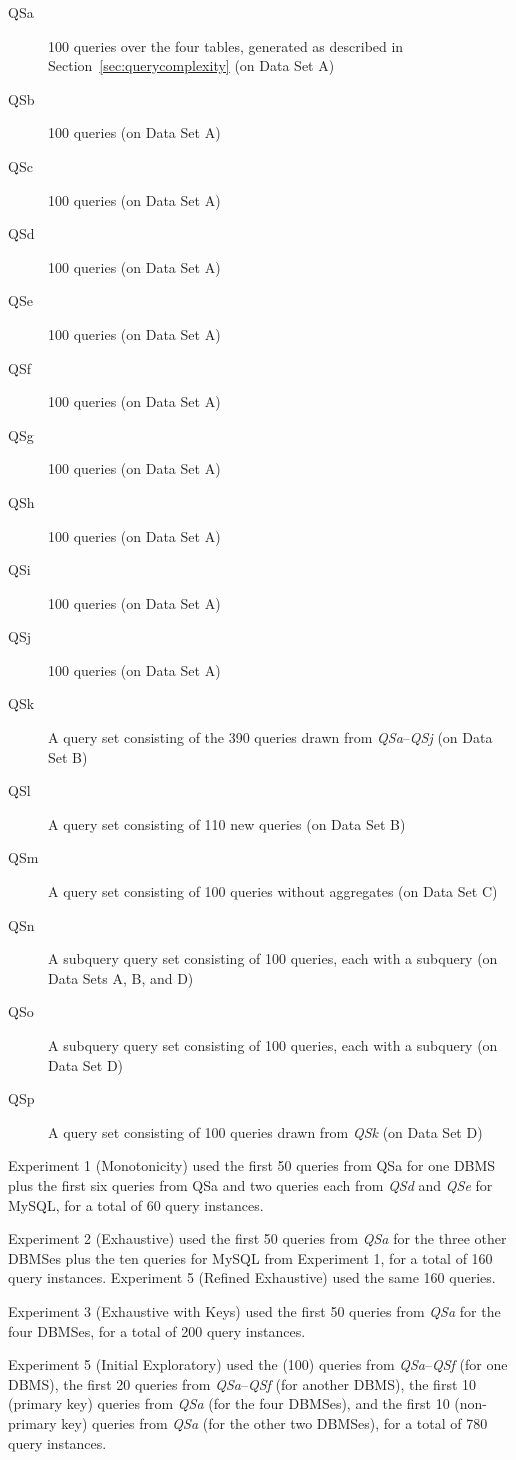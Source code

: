 \documentclass[prodmode,acmtods]{acmsmall}
\begin{document}
\begin{description}
\item[QSa] 100 queries over the four tables, generated as described in Section~\ref{sec:querycomplexity} (on Data Set A)
\item[QSb] 100 queries (on Data Set A)
\item[QSc] 100 queries (on Data Set A)
\item[QSd] 100 queries (on Data Set A)
\item[QSe] 100 queries (on Data Set A)
\item[QSf] 100 queries (on Data Set A)
\item[QSg] 100 queries (on Data Set A)
\item[QSh] 100 queries (on Data Set A)
\item[QSi] 100 queries (on Data Set A)
\item[QSj] 100 queries (on Data Set A)
\item[QSk] A query set consisting of the 390 queries drawn from {\em QSa}--{\em QSj} (on Data Set B)
\item[QSl] A query set consisting of 110 new queries (on Data Set B)
\item[QSm] A query set consisting of 100 queries without aggregates (on Data Set C)
\item[QSn] A subquery query set consisting of 100 queries, each with a subquery (on Data Sets A, B, and D)
\item[QSo] A subquery query set consisting of 100 queries, each with a subquery (on Data Set D)
\item[QSp] A query set consisting of 100 queries drawn from {\em QSk} (on Data Set D)
\end{description}

Experiment 1 (Monotonicity) used the first 50 queries from QSa
for one DBMS plus the first six queries from QSa and two queries each from
{\em QSd} and {\em QSe} for MySQL, for a total of 60 query instances.

Experiment 2 (Exhaustive) used the first 50 queries from {\em QSa}
for the three other DBMSes plus the ten queries for MySQL from Experiment 1, for
a total of 160 query instances. Experiment 5 (Refined Exhaustive) used the same 160 queries.

Experiment 3 (Exhaustive with Keys) used the first 50 queries from {\em QSa}
for the four DBMSes, for a total of 200 query instances.

Experiment 5 (Initial Exploratory) used the (100) queries from {\em
  QSa}--{\em QSf} (for
one DBMS), the first 20 queries from {\em QSa}--{\em QSf} (for another DBMS), the first
10 (primary key) queries from {\em QSa} (for the four DBMSes), and the first 10
(non-primary key) queries from {\em QSa} (for the other two DBMSes), for a total of 780 query instances.
\end{document}
